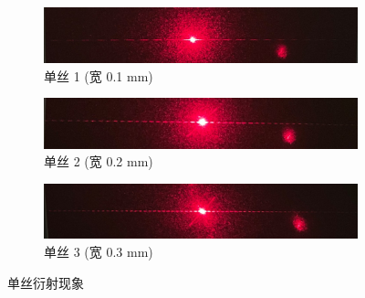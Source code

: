\documentclass[UTF8]{article}
\theoremstyle{MyLineTheoremStyle} %
\theoremstyle{MyBlockTheoremStyle} %
\theoremstyle{MySubsubsectionStyle} %
\begin{document}
\begin{figure}[H]\centering
    \begin{subfigure}[b]{\columnwidth}\centering
        \includegraphics[width=\columnwidth]{assets/4 衍射实验/细条 1.jpg}
        \caption{单丝 1 (宽 0.1 mm)}
    \end{subfigure}\hfill
    \begin{subfigure}[b]{\columnwidth}\centering
        \includegraphics[width=\columnwidth]{assets/4 衍射实验/细条 2.jpg}
        \caption{单丝 2 (宽 0.2 mm)}
    \end{subfigure}
    \begin{subfigure}[b]{\columnwidth}\centering
        \includegraphics[width=\columnwidth]{assets/4 衍射实验/细条 3.jpg}
        \caption{单丝 3 (宽 0.3 mm)}
    \end{subfigure}
\caption{单丝衍射现象}
\end{figure}
\end{document}
